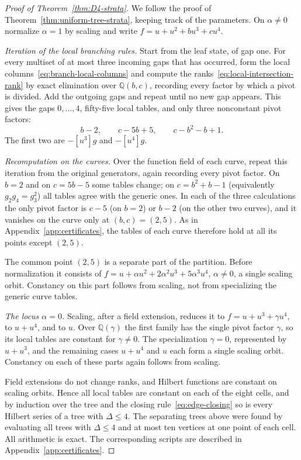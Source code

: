 \documentclass[reqno]{article}
\theoremstyle{plain} %
\theoremstyle{definition}
\theoremstyle{remark}
\numberwithin{equation}{section}
\begin{document}
\begin{proof}[Proof of Theorem~\ref{thm:D4-strata}]
We follow the proof of Theorem~\ref{thm:uniform-tree-strata}, keeping
track of the parameters. On $\alpha\ne0$ normalize $\alpha=1$ by
scaling and write $f=u+u^2+bu^3+cu^4$.

\emph{Iteration of the local branching rules.} Start from the leaf
state, of gap one. For every
multiset of at most three incoming gaps that has occurred, form the local
columns~\eqref{eq:branch-local-columns} and compute the
ranks~\eqref{eq:local-intersection-rank} by exact elimination over
$\mathbb{Q}(b,c)$, recording every factor by which a pivot is divided.
Add the outgoing gaps and repeat until no new gap appears. This gives the
gaps $0,\ldots,4$, fifty-five local tables, and only three nonconstant
pivot factors:
\[
b-2,\qquad c-5b+5,\qquad c-b^2-b+1 .
\]
The first two are $-[u^3]g$ and $-[u^4]g$.

\emph{Recomputation on the curves.} Over the function field of each
curve, repeat this iteration from the original generators, again
recording every pivot factor. On $b=2$ and on $c=5b-5$ some tables
change; on $c=b^2+b-1$ (equivalently $g_2g_4=g_3^2$) all tables agree
with the generic ones. In each of the three calculations the only pivot
factor is $c-5$ (on $b=2$) or $b-2$ (on the other two curves), and it
vanishes on the curve only at $(b,c)=(2,5)$. As in
Appendix~\ref{app:certificates}, the tables of each curve therefore hold
at all its points except $(2,5)$.

The common point $(2,5)$ is a separate part of the partition. Before
normalization it consists of
$f=u+\alpha u^2+2\alpha^2u^3+5\alpha^3u^4$, $\alpha\ne0$,
a single scaling orbit. Constancy on this part follows from scaling,
not from specializing the generic curve tables.

\emph{The locus $\alpha=0$.} Scaling, after a field extension, reduces
it to $f=u+u^3+\gamma u^4$, to $u+u^4$, and to $u$. Over
$\mathbb{Q}(\gamma)$ the first family has the single pivot factor
$\gamma$, so its local tables are constant for $\gamma\ne0$.
The specialization $\gamma=0$, represented by $u+u^3$, and the
remaining cases $u+u^4$ and $u$ each form a single scaling orbit.
Constancy on each of these parts again follows from scaling.

Field extensions do not change ranks, and Hilbert functions are constant
on scaling orbits. Hence all local tables are constant on each of the
eight cells, and by induction over the tree and the closing
rule~\eqref{eq:edge-closing} so is every Hilbert series of a tree with
$\Delta\le4$. The separating trees above were found by evaluating all
trees with $\Delta\le4$ and at most ten vertices at one point of each cell.
All arithmetic is exact. The corresponding scripts are described in
Appendix~\ref{app:certificates}.
\end{proof}
\end{document}
